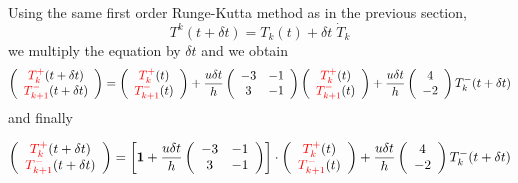 \noindent
Using the same first order Runge-Kutta method as in the previous section, 
\begin{equation}
T^k(t+\delta t)=T_k(t) +\delta t \; \dot{T}_k
\end{equation}
we multiply the equation by $\delta t$ and we obtain 
\begin{eqnarray}
\left(
\begin{array}{cc}
{\color{red} T_k^+}(t+\delta t)  \\
{\color{red}T_{k+1}^-} (t+\delta t) 
\end{array}
\right)=
 \left(
\begin{array}{cc}
{\color{red} T_k^+} (t) \\
{\color{red}T_{k+1}^-} (t) 
\end{array}
\right)+
\frac{u \delta t}{h} 
\left(\begin{array}{cc}
    -3 & -1 \\
     3 & -1
\end{array}
\right)
\left(
\begin{array}{cc}
{\color{red}T_k^+} (t) \\
{\color{red}T_{k+1}^-} (t)
\end{array}
\right) + 
\frac{u \delta t}{h} \left(
\begin{array}{cc}
     4   \\
     -2 
\end{array}
\right)T_k^- (t+\delta t) 
\end{eqnarray}
and finally
\begin{mdframed}[backgroundcolor=blue!5]
\begin{eqnarray}
\left(
\begin{array}{cc}
{\color{red} T_k^+}(t+\delta t)  \\
{\color{red}T_{k+1}^-} (t+\delta t) 
\end{array}
\right)=
\left[
{\bm 1} + 
\frac{u \delta t}{h} 
\left(\begin{array}{cc}
    -3 & -1 \\
     3 & -1
\end{array}
\right)
\right]\cdot
\left(
\begin{array}{cc}
{\color{red}T_k^+} (t) \\
{\color{red}T_{k+1}^-} (t)
\end{array}
\right) + 
\frac{u \delta t}{h} \left(
\begin{array}{cc}
     4   \\
     -2 
\end{array}
\right)T_k^- (t+\delta t) 
\label{eq:dgadv5} 
\end{eqnarray}
\end{mdframed}
